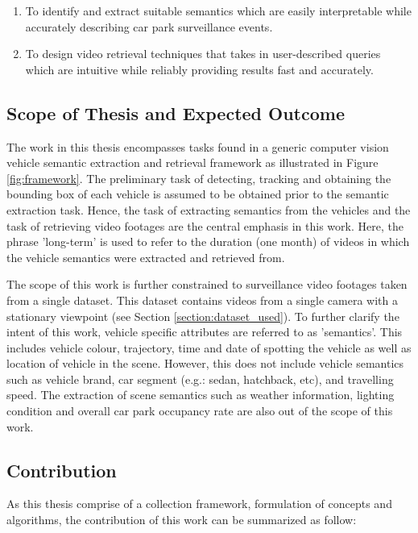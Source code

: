 \begin{enumerate}
\item To identify and extract suitable semantics which are easily interpretable while accurately describing car park surveillance events.
\item To design video retrieval techniques that takes in user-described queries which are intuitive while reliably providing results fast and accurately.
\end{enumerate}

\subsection{Scope of Thesis and Expected Outcome}
\label{subsec:scope}
The work in this thesis encompasses tasks found in a generic computer vision vehicle semantic extraction and retrieval framework as illustrated in Figure \ref{fig:framework}. The preliminary task of detecting, tracking and obtaining the bounding box of each vehicle is assumed to be obtained prior to the semantic extraction task. Hence, the task of extracting semantics from the vehicles and the task of retrieving video footages are the central emphasis in this work. Here, the phrase 'long-term' is used to refer to the duration (one month) of videos in which the vehicle semantics were extracted and retrieved from.

The scope of this work is further constrained to surveillance video footages taken from a single dataset. This dataset contains videos from a single camera with a stationary viewpoint (see Section \ref{section:dataset_used}). To further clarify the intent of this work, vehicle specific attributes are referred to as 'semantics'. This includes vehicle colour, trajectory, time and date of spotting the vehicle as well as location of vehicle in the scene. However, this does not include vehicle semantics such as vehicle brand, car segment (e.g.: sedan, hatchback, etc), and travelling speed. The extraction of scene semantics such as weather information, lighting condition and overall car park occupancy rate are also out of the scope of this work.


\subsection{Contribution}
As this thesis comprise of a collection framework, formulation of concepts and algorithms, the contribution of this work can be summarized as follow: 


